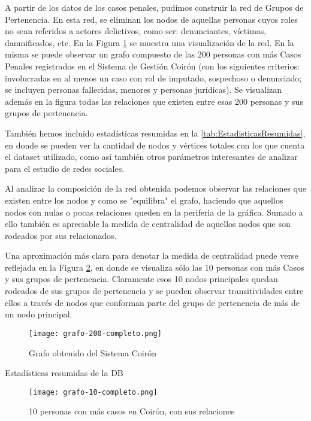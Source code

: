 A partir de los datos de los casos penales, pudimos
construir la red de Grupos de Pertenencia. En esta red, se eliminan los nodos de aquellas personas cuyos roles no sean referidos a actores delictivos, como ser: denunciantes, víctimas, damnificados, etc. En la Figura \ref{fig:grafocompleto} se muestra una visualización de la red. En la misma se puede observar un grafo compuesto de las 200 personas con más Casos Penales registrados en el Sistema de Gestión Coirón (con los siguientes criterios: involucradas en al menos un caso con rol de imputado, sospechoso o denunciado; se incluyen personas fallecidas, menores y personas jurídicas). Se visualizan además en la figura todas las relaciones que existen entre esas 200 personas y sus grupos de pertenencia.

También hemos incluido estadísticas resumidas en la \ref{tab:EstadisticasResumidas}, en donde se pueden ver la cantidad de nodos y vértices totales con los que cuenta el dataset utilizado, como así también otros parámetros interesantes de analizar para el estudio de redes sociales.

Al analizar la composición de la red obtenida podemos observar las relaciones que existen entre los nodos y como se "equilibra" el grafo, haciendo que aquellos nodos con nulas o pocas relaciones queden en la periferia de la gráfica. Sumado a ello también es apreciable la medida de centralidad de aquellos nodos que son rodeados por sus relacionados.

Una aproximación más clara para denotar la medida de centralidad puede verse reflejada en la Figura \ref{fig:grafoTop10}, en donde se visualiza sólo las 10 personas con más Casos y sus grupos de pertenencia. Claramente esos 10 nodos principales quedan rodeados de sus grupos de pertenencia y se pueden observar transitividades entre ellos a través de nodos que conforman parte del grupo de pertenencia de más de un nodo principal.



\begin{figure}
	\centering
	\texttt{[image: grafo-200-completo.png]}
	\caption{Grafo obtenido del Sistema Coirón} 
	\label{fig:grafocompleto}
\end{figure}

\begin{table}
	\caption{Estadísticas resumidas de la DB}
	\label{tab:EstadisticasResumidas}
\end{table}

\begin{figure}
	\texttt{[image: grafo-10-completo.png]}
	\caption{10 personas con más casos en Coirón, con sus relaciones} 
	\label{fig:grafoTop10}
\end{figure}